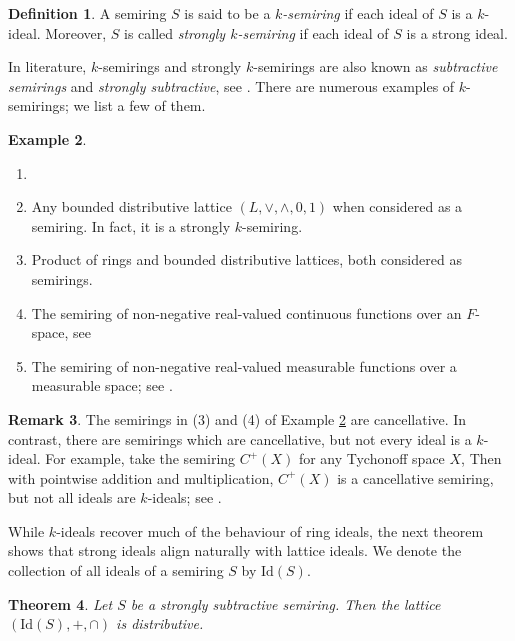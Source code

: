 \documentclass[11pt,english]{amsart}
\newtheorem{theorem}{Theorem}[section]
\theoremstyle{definition}
\newtheorem{definition}[theorem]{Definition}
\newtheorem{example}[theorem]{Example}
\newtheorem{remark}[theorem]{Remark}
\numberwithin{equation}{section}
\begin{document}
\begin{definition}
    A semiring $S$ is said to be a \emph{$k$-semiring} if each ideal of $S$ is a $k$-ideal. Moreover, $S$ is called \emph{strongly $k$-semiring}  if each ideal of $S$ is a strong ideal. 
\end{definition}

In literature, $k$-semirings and strongly $k$-semirings are also known as \emph{subtractive semirings} and \emph{strongly subtractive}, see \cite{Katsov09, Katsov11, Il'inKatsovNam17}. There are numerous examples of $k$-semirings; we list a few of them.

\begin{example}\label{example: subtractive semirings}
\begin{enumerate}
    \item[] 
        \item Any bounded distributive lattice $(L,\vee,\wedge,0,1)$ when considered as a semiring. In fact, it is a strongly $k$-semiring.
        \item Product of rings and bounded distributive lattices, both considered as semirings.
        \item The semiring of non-negative real-valued continuous functions over an $F$-space, see \cite[Theorem 3.9]{BiswasBagSardarFilomat24}
        \item The semiring of non-negative real-valued measurable functions over a measurable space; see \cite[Corollary 3.2]{BiswasBagSardarFilomat25}.
    \end{enumerate}
\end{example}

\begin{remark}
    The semirings in (3) and (4) of Example \ref{example: subtractive semirings} are cancellative. In contrast, there are semirings which are cancellative, but not every ideal is a $k$-ideal. For example, take the semiring $C^+(X)$ for any Tychonoff space $X$, Then with pointwise addition and multiplication, $C^+(X)$ is a cancellative semiring, but not all ideals are $k$-ideals; see \cite[Example 3.1]{BiswasBagSardarFilomat24}.
\end{remark}

While $k$-ideals recover much of the behaviour of ring ideals, the next theorem shows that strong ideals align naturally with lattice ideals. We denote the collection of all ideals of a semiring $S$ by $\mathrm{Id}(S)$. 

\begin{theorem}\label{Ideal lattice of strongly subtractive is distributive}
    Let $S$ be a strongly subtractive semiring. Then the lattice $(\mathrm{Id}(S),+,\cap)$ is distributive. 
\end{theorem}
\end{document}
